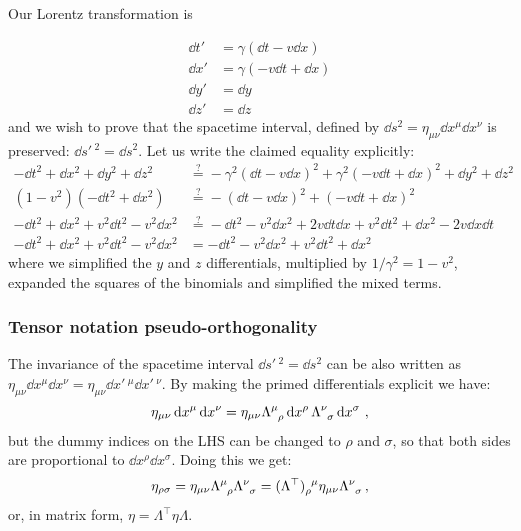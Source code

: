 \documentclass[main.tex]{subfiles}
\begin{document}
Our Lorentz transformation is

\begin{subequations}
\begin{align}
    \dd{t}' &= \gamma (\dd{t} - v \dd{x}) \\
    \dd{x}' &= \gamma (-v\dd{t} + \dd{x}) \\
    \dd{y}' &= \dd{y} \\
    \dd{z}' &= \dd{z}
\end{align}
\end{subequations}
%
and we wish to prove that the spacetime interval, defined by $\dd{s^2} = \eta_{\mu\nu} \dd{x^\mu}\dd{x^\nu}$ is preserved: $\dd{s'\,^2} = \dd{s^2}$.
Let us write the claimed equality explicitly:
%
\begin{subequations}
\begin{align}
    -\dd{t^2} + \dd{x^2}+ \dd{y^2}+ \dd{z^2}
    &\overset{?}{=}  - \gamma^2 (\dd{t} - v \dd{x})^2
    + \gamma^2 (-v\dd{t} + \dd{x}) ^2
    +  \dd{y^2}+ \dd{z^2} \\
    (1-v^2) (-\dd{t^2} + \dd{x^2})
    &\overset{?}{=} - (\dd{t} - v \dd{x})^2
    + (-v\dd{t} + \dd{x}) ^2 \\
    -\dd{t^2} + \dd{x^2}
    +v^2\dd{t^2} -v^2 \dd{x^2}
    &\overset{?}{=}  - \dd{t}^2 - v^2 \dd{x}^2 +2v\dd{t} \dd{x}
    + v^2\dd{t}^2 + \dd{x}^2 -2v\dd{x}\dd{t} \\
    -\dd{t^2} + \dd{x^2}
    +v^2\dd{t^2} -v^2 \dd{x^2}
    &= - \dd{t}^2 - v^2 \dd{x}^2
    + v^2\dd{t}^2 + \dd{x}^2
\end{align}
\end{subequations}
%
where we simplified the \(y\) and \(z\) differentials, multiplied by \(1/\gamma^2 = 1-v^2\),  expanded the squares of the binomials and simplified the mixed terms.

\subsubsection{Tensor notation pseudo-orthogonality}

The invariance of the spacetime interval $\dd{s'\,^2} = \dd{s^2}$ can be also written as \(\eta_{\mu\nu} \dd{x^\mu} \dd{x^\nu} = \eta_{\mu\nu} \dd{x'\,^\mu} \dd{x'\,^\nu}\). By making the primed differentials explicit we have:
%
\begin{equation}
  \eta_{\mu\nu} \dd{x^\mu} \dd{x^\nu}
  =
  \eta_{\mu\nu} \tensor{\Lambda}{^\mu_\rho} \dd{x^\rho} \tensor{\Lambda}{^\nu_\sigma} \dd{x^\sigma} \,,
\end{equation}
%
but the dummy indices on the LHS can be changed to \(\rho\) and \(\sigma\), so that both sides are proportional to  \(\dd{x^\rho}\dd{x^\sigma}\). Doing this we get:
%
\begin{equation}
  \eta_{\rho\sigma}
  =
  \eta_{\mu\nu} \tensor{\Lambda}{^\mu_\rho} \tensor{\Lambda}{^\nu_\sigma}
  =\tensor{(\Lambda^\top)}{_\rho^\mu} \eta_{\mu\nu} \tensor{\Lambda}{^\nu_\sigma} \,,
\end{equation}
%
or, in matrix form, \(\eta = \Lambda^\top \eta \Lambda\).
\end{document}

